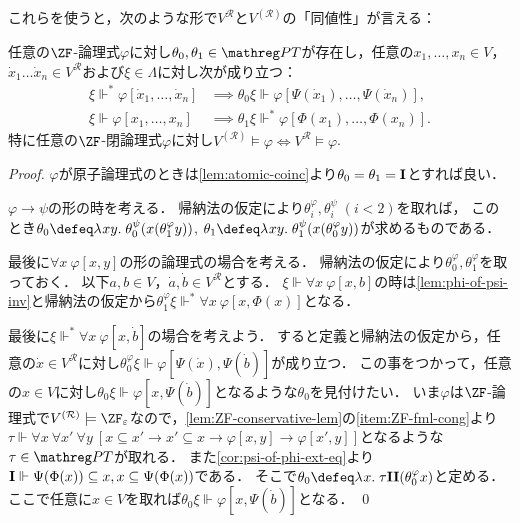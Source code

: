 \documentclass[realisability.tex]{subfiles}
\begin{document}
これらを使うと，次のような形で$V^{\mathcal{R}}$と$V^{(\mathcal{R})}$の「同値性」が言える：
\begin{theorem}
 任意の$\ZF$-論理式$\varphi$に対し$\theta_0, \theta_1 \in \PT$が存在し，任意の$x_1, \dots, x_n \in V$，$\dot{x}_1 \dots \dot{x}_n \in V^{\mathcal{R}}$および$\xi \in \Lambda$に対し次が成り立つ：
 \begin{align*}
  \xi \Vdash^* \varphi[\dot{x}_1, \dots, \dot{x}_n] &\implies \theta_0 \xi \Vdash \varphi[\Psi(\dot{x}_1), \dots, \Psi(\dot{x}_n)],\\
  \xi \Vdash \varphi[x_1, \dots, x_n] &\implies \theta_1 \xi \Vdash^* \varphi[\Phi(x_1), \dots, \Phi(x_n)].
 \end{align*}
 特に任意の$\ZF$-閉論理式$\varphi$に対し$V^{(\mathcal{R})} \models \varphi \iff V^{\mathcal{R}} \models \varphi$.
\end{theorem}
\begin{proof}
 $\varphi$が原子論理式のときは\cref{lem:atomic-coinc}より$\theta_0 = \theta_1 = \mathsf{\mathbf{I}}$とすれば良い．

 $\varphi \to \psi$の形の時を考える．
 帰納法の仮定により$\theta^\varphi_i, \theta^\psi_i\;(i < 2)$を取れば，
 このとき$\theta_0 \defeq \abs{xy}{\theta^\psi_0(x(\theta^\varphi_1 y))}$, $\theta_1 \defeq \abs{xy}{\theta^\psi_1(x(\theta^\varphi_0 y))}$が求めるものである．

 最後に$\forall x \: \varphi[x, y]$の形の論理式の場合を考える．
 帰納法の仮定により$\theta^\varphi_0, \theta^\varphi_1$を取っておく．
 以下$a,b \in V$，$\dot{a}, \dot{b} \in V^{\mathcal{R}}$とする．
 $\xi \Vdash \forall x \: \varphi[x, b]$の時は\cref{lem:phi-of-psi-inv}と帰納法の仮定から$\theta^\varphi_1 \xi \Vdash^* \forall x \: \varphi[x, \Phi(x)]$となる．

 最後に$\xi \Vdash^* \forall x \: \varphi[x, \dot{b}]$の場合を考えよう．
 すると定義と帰納法の仮定から，任意の$\dot{x} \in V^{\mathcal{R}}$に対し$\theta^\varphi_0 \xi \Vdash \varphi[\Psi(\dot{x}), \Psi(\dot{b})]$が成り立つ．
 この事をつかって，任意の$x \in V$に対し$\theta_0 \xi \Vdash \varphi[x, \Psi(\dot{b})]$となるような$\theta_0$を見付けたい．
 いま$\varphi$は$\ZF$-論理式で$V^{(\mathcal{R})} \models \ZFe$なので，\cref{lem:ZF-conservative-lem}の\ref{item:ZF-fml-cong}より$\tau \Vdash \forall x \: \forall x'\: \forall y \: [x \subseteq x' \to x' \subseteq x \to \varphi[x, y] \to \varphi[x', y]]$となるような$\tau \in \PT$が取れる．
 また\cref{cor:psi-of-phi-ext-eq}より$\mathsf{\mathbf{I}} \Vdash \Psi(\Phi(x)) \subseteq x, x \subseteq \Psi(\Phi(x))$である．
 そこで$\theta_0 \defeq \abs{x}{\tau\I\I(\theta^\varphi_0 x)}$と定める．
 ここで任意に$x \in V$を取れば$\theta_0 \xi \Vdash \varphi[x, \Psi(\dot{b})]$となる． \qed
\end{proof}
\end{document}
